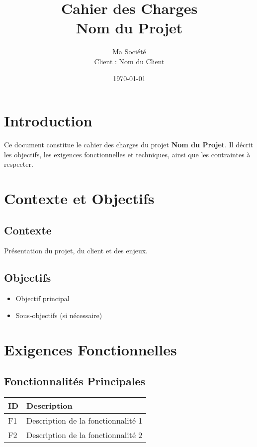 \documentclass[a4paper, 12pt]{report}
\title{Cahier des Charges \\ \textbf{Nom du Projet}}
\author{Ma Société \\ Client : Nom du Client}
\date{\today}
\begin{document}
\maketitle

\tableofcontents

\chapter*{Introduction}
Ce document constitue le cahier des charges du projet \textbf{Nom du Projet}. Il décrit les objectifs, les exigences fonctionnelles et techniques, ainsi que les contraintes à respecter.

\chapter{Contexte et Objectifs}
\section{Contexte}
Présentation du projet, du client et des enjeux.

\section{Objectifs}
\begin{itemize}
    \item Objectif principal
    \item Sous-objectifs (si nécessaire)
\end{itemize}

\chapter{Exigences Fonctionnelles}
\section{Fonctionnalités Principales}
\begin{tabularx}{\textwidth}{|l|X|}
    \hline
    \textbf{ID} & \textbf{Description} \\ \hline
    F1 & Description de la fonctionnalité 1 \\ \hline
    F2 & Description de la fonctionnalité 2 \\ \hline
\end{tabularx}
\end{document}
